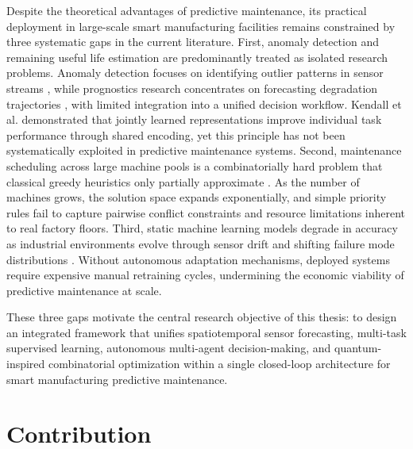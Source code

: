 Despite the theoretical advantages of predictive maintenance, its practical deployment in large-scale smart manufacturing facilities remains constrained by three systematic gaps in the current literature. First, anomaly detection and remaining useful life estimation are predominantly treated as isolated research problems. Anomaly detection focuses on identifying outlier patterns in sensor streams \cite{chen_unsupervised_2020}, while prognostics research concentrates on forecasting degradation trajectories \cite{nizam_real-time_2022}, with limited integration into a unified decision workflow. Kendall et al. \cite{kendall_multi-task_2017} demonstrated that jointly learned representations improve individual task performance through shared encoding, yet this principle has not been systematically exploited in predictive maintenance systems. Second, maintenance scheduling across large machine pools is a combinatorially hard problem that classical greedy heuristics only partially approximate \cite{dalyac_qualifying_2021}. As the number of machines grows, the solution space expands exponentially, and simple priority rules fail to capture pairwise conflict constraints and resource limitations inherent to real factory floors. Third, static machine learning models degrade in accuracy as industrial environments evolve through sensor drift and shifting failure mode distributions \cite{lee_autoencoder-based_2024}. Without autonomous adaptation mechanisms, deployed systems require expensive manual retraining cycles, undermining the economic viability of predictive maintenance at scale.

These three gaps motivate the central research objective of this thesis: to design an integrated framework that unifies spatiotemporal sensor forecasting, multi-task supervised learning, autonomous multi-agent decision-making, and quantum-inspired combinatorial optimization within a single closed-loop architecture for smart manufacturing predictive maintenance.

\section{Contribution}

